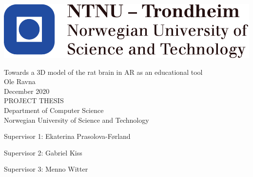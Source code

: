 
\thispagestyle{empty}
\includegraphics[scale=1.1]{fig/NTNU}
\mbox{}\\[6pc]
\begin{center}
\Huge{Towards a 3D model of the rat brain in AR as an educational tool}\\[2pc]

\Large{Ole Ravna}\\[1pc]
\large{December 2020}\\[2pc]

PROJECT THESIS\\
Department of Computer Science\\
Norwegian University of Science and Technology
\end{center}
\vfill


\noindent Supervisor 1: Ekaterina Prasolova-Førland

\noindent Supervisor 2: Gabriel Kiss 

\noindent Supervisor 3: Menno Witter

